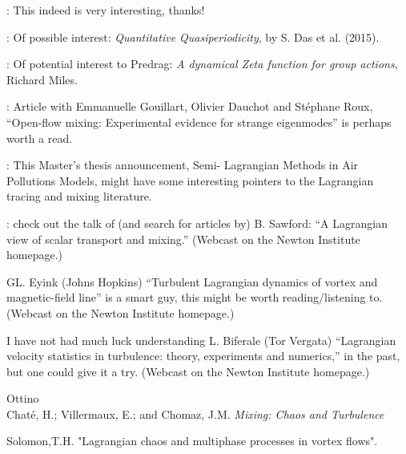 \documentclass[letter,10pt,openany]{article}
\begin{document}
\medskip{}: This indeed is very interesting,
thanks!

\medskip{}: Of possible interest:
 {\em Quantitative Quasiperiodicity}, by
S. Das et al. (2015).

\medskip{}: Of potential interest to Predrag:
\textit{A dynamical Zeta function for group actions}, Richard Miles.

\medskip{}:
Article with Emmanuelle Gouillart, Olivier Dauchot
 and St\'ephane Roux,
``Open-flow mixing: Experimental evidence for strange eigenmodes''
is perhaps worth a read.

\medskip{}:
This Master's thesis announcement,
     {Semi- Lagrangian Methods in Air Pollutions Models},
might have some interesting pointers to
the Lagrangian tracing and mixing literature.

\medskip{}:
check out the talk of (and search for articles by)
     {B. Sawford}:
  	``A Lagrangian view of scalar transport and mixing.''
(Webcast on the Newton Institute homepage.)

\noindent
{}
    {GL. Eyink} (Johns Hopkins)
  	``Turbulent Lagrangian dynamics of vortex and magnetic-field line''
is a smart guy, this might be worth reading/listening to.
(Webcast on the Newton Institute homepage.)

\noindent
I have not had much luck understanding
        {L. Biferale} (Tor Vergata)
  	``Lagrangian velocity statistics in turbulence: theory, experiments and numerics,''
in the past, but one could give it a try.
(Webcast on the Newton Institute homepage.)


Ottino
\\

\noindent
 Chat\'e, H.; Villermaux, E.; and Chomaz, J.M.
{\em Mixing: Chaos
and Turbulence}

\noindent
    Solomon,T.H. \etal "Lagrangian chaos and multiphase processes in
    vortex flows".
\end{document}
